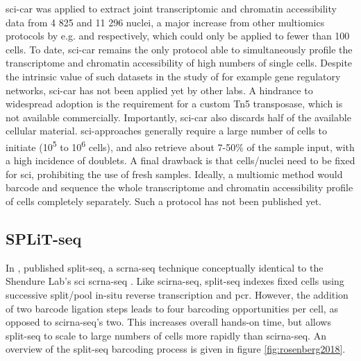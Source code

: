 \Acrshort{sci-car} was applied to extract joint transcriptomic and chromatin accessibility data from 4 825 and 11 296 nuclei, a major increase from other multiomics protocols by e.g. \citet{hou2016} and \citet{clark2018} respectively, which could only be applied to fewer than 100 cells. To date, \acrshort{sci-car} remains the only protocol able to simultaneously profile the transcriptome and chromatin accessibility of high numbers of single cells. Despite the intrinsic value of such datasets in the study of for example gene regulatory networks, \acrshort{sci-car} has not been applied yet by other labs. A hindrance to widespread adoption is the requirement for a custom Tn5 transposase, which is not available commercially. Importantly, \acrshort{sci-car} also discards half of the available cellular material. \Acrshort{sci}-approaches generally require a large number of cells to initiate (10\textsuperscript{5} to 10\textsuperscript{6} cells), and also retrieve about 7-50\% of the sample input, with a high incidence of doublets. A final drawback is that cells/nuclei need to be fixed for \acrshort{sci}, prohibiting the use of fresh samples. Ideally, a multiomic method would barcode and sequence the whole transcriptome and chromatin accessibility profile of cells completely separately. Such a protocol has not been published yet.\pms

\clearpage
\subsection{SPLiT-seq}
\label{subsect:lit_split-seq}
In \citeyear{rosenberg2018}, \citeauthor{rosenberg2018} published \acrfull{split-seq}, a \acrshort{scrna-seq} technique conceptually identical to the Shendure Lab's \acrlong{sci} \acrshort{scrna-seq} \citep{cusanovich2015,rosenberg2018}. Like \acrshort{scirna-seq}, \acrshort{split-seq} indexes fixed cells using successive split/pool in-situ reverse transcription and \acrshort{pcr}. However, the addition of two barcode ligation steps leads to four barcoding opportunities per cell, as opposed to \acrshort{scirna-seq}'s two. This increases overall hands-on time, but allows \acrshort{split-seq} to scale to large numbers of cells more rapidly than \acrshort{scirna-seq}. An overview of the \acrshort{split-seq} barcoding process is given in figure \ref{fig:rosenberg2018}.\pms

